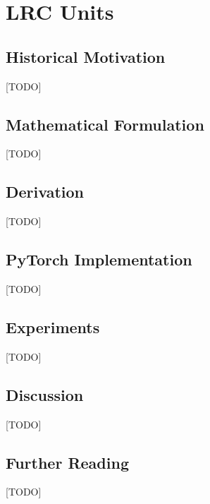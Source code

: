 
\chapter{LRC Units}
\label{ch:17_lrcu}


\section{Historical Motivation}
[TODO]

\section{Mathematical Formulation}
[TODO]

\section{Derivation}
[TODO]

\section{PyTorch Implementation}
[TODO]

\section{Experiments}
[TODO]

\section{Discussion}
[TODO]

\section{Further Reading}
[TODO]
